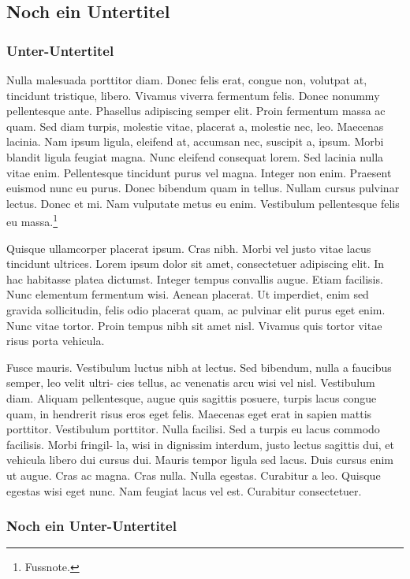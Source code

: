 \documentclass[ngerman,titlepage]{uzhpub}
\begin{document}
\subsection{Noch ein Untertitel}

\subsubsection{Unter-Untertitel}

Nulla malesuada porttitor diam. Donec felis erat, congue non, volutpat
at, tincidunt tristique, libero. Vivamus viverra fermentum felis.
Donec nonummy pellentesque ante. Phasellus adipiscing semper elit.
Proin fermentum massa ac quam. Sed diam turpis, molestie vitae, placerat
a, molestie nec, leo. Maecenas lacinia. Nam ipsum ligula, eleifend
at, accumsan nec, suscipit a, ipsum. Morbi blandit ligula feugiat
magna. Nunc eleifend consequat lorem. Sed lacinia nulla vitae enim.
Pellentesque tincidunt purus vel magna. Integer non enim. Praesent
euismod nunc eu purus. Donec bibendum quam in tellus. Nullam cursus
pulvinar lectus. Donec et mi. Nam vulputate metus eu enim. Vestibulum
pellentesque felis eu massa.\footnote{Fussnote.}

Quisque ullamcorper placerat ipsum. Cras nibh. Morbi vel justo vitae
lacus tincidunt ultrices. Lorem ipsum dolor sit amet, consectetuer
adipiscing elit. In hac habitasse platea dictumst. Integer tempus
convallis augue. Etiam facilisis. Nunc elementum fermentum wisi. Aenean
placerat. Ut imperdiet, enim sed gravida sollicitudin, felis odio
placerat quam, ac pulvinar elit purus eget enim. Nunc vitae tortor.
Proin tempus nibh sit amet nisl. Vivamus quis tortor vitae risus porta
vehicula. 

Fusce mauris. Vestibulum luctus nibh at lectus. Sed bibendum, nulla
a faucibus semper, leo velit ultri- cies tellus, ac venenatis arcu
wisi vel nisl. Vestibulum diam. Aliquam pellentesque, augue quis sagittis
posuere, turpis lacus congue quam, in hendrerit risus eros eget felis.
Maecenas eget erat in sapien mattis porttitor. Vestibulum porttitor.
Nulla facilisi. Sed a turpis eu lacus commodo facilisis. Morbi fringil-
la, wisi in dignissim interdum, justo lectus sagittis dui, et vehicula
libero dui cursus dui. Mauris tempor ligula sed lacus. Duis cursus
enim ut augue. Cras ac magna. Cras nulla. Nulla egestas. Curabitur
a leo. Quisque egestas wisi eget nunc. Nam feugiat lacus vel est.
Curabitur consectetuer.

\subsubsection{Noch ein Unter-Untertitel}
\end{document}
